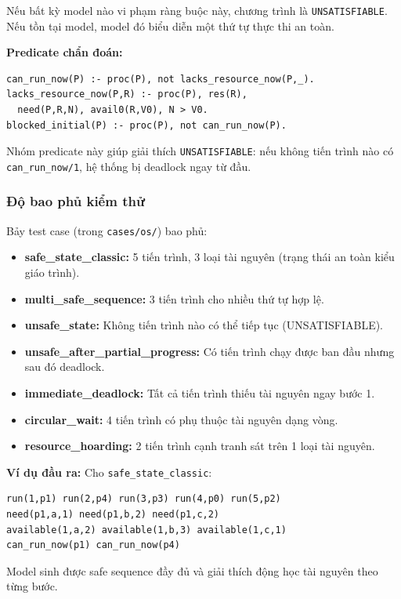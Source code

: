 \documentclass[a4paper,11pt]{article}
\begin{document}
Nếu bất kỳ model nào vi phạm ràng buộc này, chương trình là \texttt{UNSATISFIABLE}.
Nếu tồn tại model, model đó biểu diễn một thứ tự thực thi an toàn.

\textbf{Predicate chẩn đoán:}
\begin{lstlisting}
can_run_now(P) :- proc(P), not lacks_resource_now(P,_).
lacks_resource_now(P,R) :- proc(P), res(R), 
  need(P,R,N), avail0(R,V0), N > V0.
blocked_initial(P) :- proc(P), not can_run_now(P).
\end{lstlisting}

Nhóm predicate này giúp giải thích \texttt{UNSATISFIABLE}: nếu không tiến trình nào có
\texttt{can\_run\_now/1}, hệ thống bị deadlock ngay từ đầu.

\subsubsection*{Độ bao phủ kiểm thử}

Bảy test case (trong \texttt{cases/os/}) bao phủ:
\begin{itemize}
  \item \textbf{safe\_state\_classic:} 5 tiến trình, 3 loại tài nguyên (trạng thái an toàn kiểu giáo trình).
  \item \textbf{multi\_safe\_sequence:} 3 tiến trình cho nhiều thứ tự hợp lệ.
  \item \textbf{unsafe\_state:} Không tiến trình nào có thể tiếp tục (UNSATISFIABLE).
  \item \textbf{unsafe\_after\_partial\_progress:} Có tiến trình chạy được ban đầu nhưng sau đó deadlock.
  \item \textbf{immediate\_deadlock:} Tất cả tiến trình thiếu tài nguyên ngay bước 1.
  \item \textbf{circular\_wait:} 4 tiến trình có phụ thuộc tài nguyên dạng vòng.
  \item \textbf{resource\_hoarding:} 2 tiến trình cạnh tranh sát trên 1 loại tài nguyên.
\end{itemize}

\textbf{Ví dụ đầu ra:} Cho \texttt{safe\_state\_classic}:
\begin{lstlisting}
run(1,p1) run(2,p4) run(3,p3) run(4,p0) run(5,p2)
need(p1,a,1) need(p1,b,2) need(p1,c,2)
available(1,a,2) available(1,b,3) available(1,c,1)
can_run_now(p1) can_run_now(p4)
\end{lstlisting}

Model sinh được safe sequence đầy đủ và giải thích động học tài nguyên theo từng bước.
\end{document}
